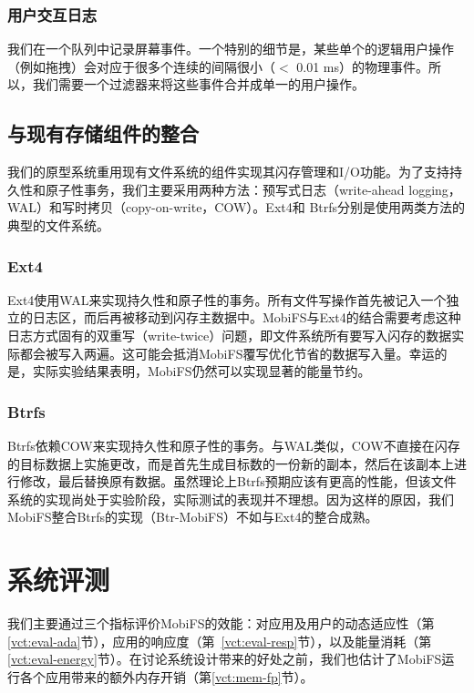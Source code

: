 \subsubsection{用户交互日志}
我们在一个队列中记录屏幕事件。一个特别的细节是，某些单个的逻辑用户操作（例如拖拽）会对应于很多个连续的间隔很小（$<$ 0.01 ms）的物理事件。所以，我们需要一个过滤器来将这些事件合并成单一的用户操作。

\subsection{与现有存储组件的整合}
\label{vct:ext4}

我们的原型系统重用现有文件系统的组件实现其闪存管理和I/O功能。为了支持持久性和原子性事务，我们主要采用两种方法：预写式日志（write-ahead logging，WAL）和写时拷贝（copy-on-write，COW）。Ext4和 Btrfs分别是使用两类方法的典型的文件系统。

\subsubsection{Ext4}
Ext4使用WAL来实现持久性和原子性的事务。所有文件写操作首先被记入一个独立的日志区，而后再被移动到闪存主数据中。MobiFS与Ext4的结合需要考虑这种日志方式固有的双重写（write-twice）问题，即文件系统所有要写入闪存的数据实际都会被写入两遍。这可能会抵消MobiFS覆写优化节省的数据写入量。幸运的是，实际实验结果表明，MobiFS仍然可以实现显著的能量节约。

\subsubsection{Btrfs}
Btrfs依赖COW来实现持久性和原子性的事务。与WAL类似，COW不直接在闪存的目标数据上实施更改，而是首先生成目标数的一份新的副本，然后在该副本上进行修改，最后替换原有数据。虽然理论上Btrfs预期应该有更高的性能，但该文件系统的实现尚处于实验阶段，实际测试的表现并不理想。因为这样的原因，我们MobiFS整合Btrfs的实现（Btr-MobiFS）不如与Ext4的整合成熟。

\section{系统评测}
\label{vct:eval}

我们主要通过三个指标评价MobiFS的效能：对应用及用户的动态适应性（第\ref{vct:eval-ada}节），应用的响应度（第~\ref{vct:eval-resp}节），以及能量消耗（第\ref{vct:eval-energy}节）。在讨论系统设计带来的好处之前，我们也估计了MobiFS运行各个应用带来的额外内存开销（第\ref{vct:mem-fp}节）。

